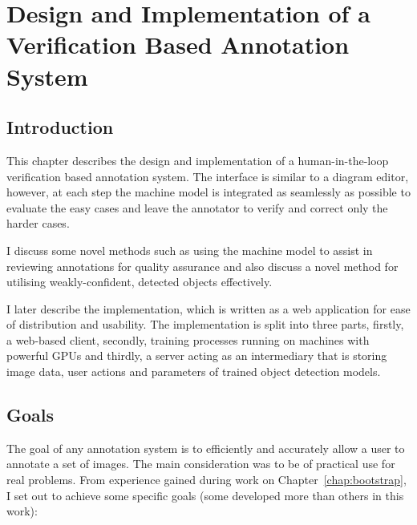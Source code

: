 \chapter{Design and Implementation of a Verification Based Annotation System}
\label{chap:design} 

\section{Introduction}

This chapter describes the design and implementation of a human-in-the-loop verification based annotation system. The interface is similar to a diagram editor, however, at each step the machine model is integrated as seamlessly as possible to evaluate the easy cases and leave the annotator to verify and correct only the harder cases. 

I discuss some novel methods such as using the machine model to assist in reviewing annotations for quality assurance and also discuss a novel method for utilising weakly-confident, detected objects effectively.

I later describe the implementation, which is written as a web application for ease of distribution and usability. The implementation is split into three parts, firstly, a web-based client, secondly, training processes running on machines with powerful \gls{GPU}s and thirdly, a server acting as an intermediary that is storing image data, user actions and parameters of trained object detection models.

\section {Goals}

The goal of any annotation system is to efficiently and accurately allow a user to annotate a set of images. The main consideration was to be of practical use for real problems. From experience gained during work on Chapter~\ref{chap:bootstrap}, I set out to achieve some specific goals (some developed more than others in this work):

